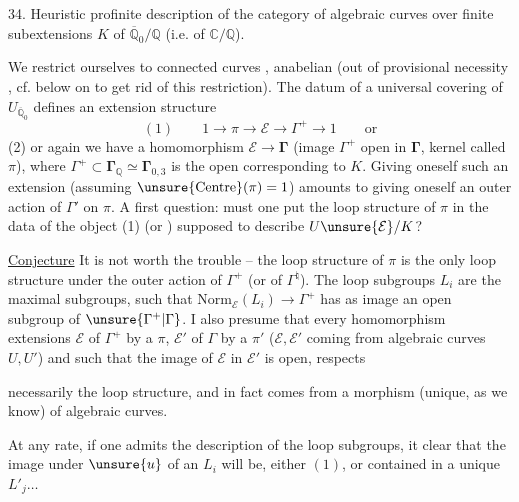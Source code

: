 
34. Heuristic profinite description of the category
of algebraic curves  over  finite
subextensions $K$ of $\overline{\mathbb Q}_0/\mathbb Q$ (i.e. of $\mathbb C/\mathbb Q$).

We restrict ourselves to  connected curves , anabelian
(out of provisional necessity \unsure{!}, cf. below on  to
get rid of this restriction). The datum of
a universal covering of  $U_{\overline{\mathbb Q}_0}$ defines an
extension structure
\[
(1)\qquad 1\longrightarrow\pi\longrightarrow\mathcal E\longrightarrow\Gamma^{+}\longrightarrow1\qquad\text{or}
\]
(2) or again we have a homomorphism $\mathcal E\longrightarrow\boldsymbol{\Gamma}$
(image $\Gamma^{+}$ open in $\boldsymbol{\Gamma}$,
kernel called $\pi$),
where $\Gamma^{+}\subset\boldsymbol{\Gamma}_{\mathbb Q}\simeq\boldsymbol{\Gamma}_{0,3}$ is the open 
corresponding to $K$. Giving oneself such an
extension (assuming $\unsure{\mathrm{Centre}}(\pi)=1$) amounts to
giving oneself an outer action of $\Gamma'$ on $\pi$.
A first question: must one put the
loop structure of $\pi$ in the  data  of
the object (1) (or ) supposed to describe $U\unsure{\mathcal E}/K$?

\uline{Conjecture} It is not worth the trouble -- the loop structure
of $\pi$ is the only loop structure 
under the outer action of $\Gamma^{+}$ (or of $\Gamma^{\natural}$). The
loop subgroups $L_i$ are the maximal
subgroups, such that $\mathrm{Norm}_{\mathcal E}(L_i)\longrightarrow\Gamma^{+}$ has
as image an open subgroup of $\unsure{\Gamma^{+}|\Gamma}$.
I
also presume that every homomorphism  extensions
$\mathcal E$ of $\Gamma^{+}$ by a $\pi$, $\mathcal E'$ of $\Gamma$ by a $\pi'$
($\mathcal E,\mathcal E'$ coming from algebraic curves $U,U'$) and such
that the image of $\mathcal E$ in $\mathcal E'$ is open, respects

necessarily the loop structure, and in fact
comes from a morphism (unique, as we know) of algebraic
curves.

At any rate, if one admits the description of the
loop subgroups, it  clear that the image under
$\unsure{u}$ of an $L_i$ will be, either $(1)$, or contained
in a unique $L'_j\ldots$

